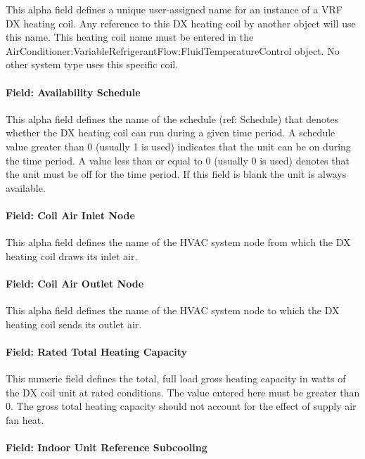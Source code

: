 This alpha field defines a unique user-assigned name for an instance of a VRF DX heating coil. Any reference to this DX heating coil by another object will use this name. This heating coil name must be entered in the AirConditioner:VariableRefrigerantFlow:FluidTemperatureControl object. No other system type uses this specific coil.

\paragraph{Field: Availability Schedule}\label{field-availability-schedule}

This alpha field defines the name of the schedule (ref: Schedule) that denotes whether the DX heating coil can run during a given time period. A schedule value greater than 0 (usually 1 is used) indicates that the unit can be on during the time period. A value less than or equal to 0 (usually 0 is used) denotes that the unit must be off for the time period. If this field is blank the unit is always available.

\paragraph{Field: Coil Air Inlet Node}\label{field-coil-air-inlet-node-2}

This alpha field defines the name of the HVAC system node from which the DX heating coil draws its inlet air.

\paragraph{Field: Coil Air Outlet Node}\label{field-coil-air-outlet-node-2}

This alpha field defines the name of the HVAC system node to which the DX heating coil sends its outlet air.

\paragraph{Field: Rated Total Heating Capacity}\label{field-rated-total-heating-capacity}

This numeric field defines the total, full load gross heating capacity in watts of the DX coil unit at rated conditions. The value entered here must be greater than 0. The gross total heating capacity should not account for the effect of supply air fan heat.

\paragraph{Field: Indoor Unit Reference Subcooling}\label{field-indoor-unit-reference-subcooling}

